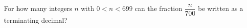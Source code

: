 For how many integers $n$ with $0<n<699$ can the fraction $\dfrac{n}{700}$ be written as a terminating decimal?
